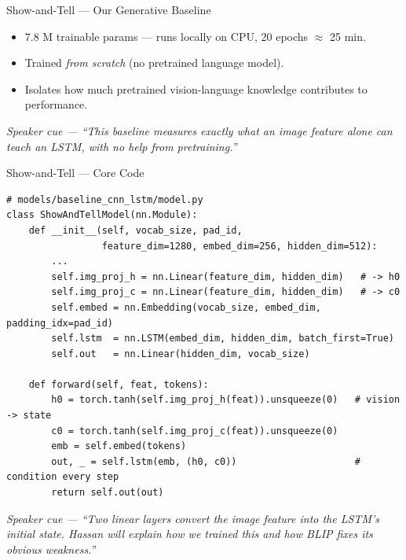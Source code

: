 \documentclass[10pt, aspectratio=169]{beamer}
\newcommand{\speakercue}[1]{%
  \vfill
  {\footnotesize\itshape\color{gray}Speaker cue --- #1}%
}
\begin{document}
\begin{frame}{Show-and-Tell --- Our Generative Baseline}
  \begin{center}
  \end{center}
  \begin{itemize}\itemsep2pt
    \item 7.8 M trainable params --- runs locally on CPU, 20 epochs $\approx$ 25 min.
    \item Trained \emph{from scratch} (no pretrained language model).
    \item Isolates how much pretrained vision-language knowledge contributes to performance.
  \end{itemize}
  \speakercue{``This baseline measures exactly what an image feature alone can teach
  an LSTM, with no help from pretraining.''}
\end{frame}

\begin{frame}[fragile]{Show-and-Tell --- Core Code}
  \begin{lstlisting}
# models/baseline_cnn_lstm/model.py
class ShowAndTellModel(nn.Module):
    def __init__(self, vocab_size, pad_id,
                 feature_dim=1280, embed_dim=256, hidden_dim=512):
        ...
        self.img_proj_h = nn.Linear(feature_dim, hidden_dim)   # -> h0
        self.img_proj_c = nn.Linear(feature_dim, hidden_dim)   # -> c0
        self.embed = nn.Embedding(vocab_size, embed_dim, padding_idx=pad_id)
        self.lstm  = nn.LSTM(embed_dim, hidden_dim, batch_first=True)
        self.out   = nn.Linear(hidden_dim, vocab_size)

    def forward(self, feat, tokens):
        h0 = torch.tanh(self.img_proj_h(feat)).unsqueeze(0)   # vision -> state
        c0 = torch.tanh(self.img_proj_c(feat)).unsqueeze(0)
        emb = self.embed(tokens)
        out, _ = self.lstm(emb, (h0, c0))                     # condition every step
        return self.out(out)
  \end{lstlisting}
  \speakercue{``Two linear layers convert the image feature into the LSTM's initial
  state. Hassan will explain how we trained this and how BLIP fixes its obvious weakness.''}
\end{frame}
\end{document}
